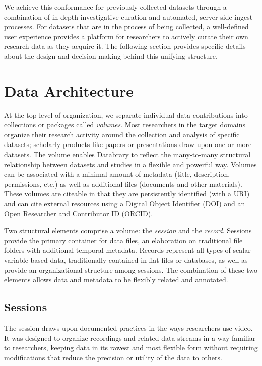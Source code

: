 \documentclass{sig-alternate}
\begin{document}
We achieve this conformance for previously collected datasets through a combination of in-depth investigative curation and automated, server-side ingest processes.
For datasets that are in the process of being collected, a well-defined user experience provides a platform for researchers to actively curate their own research data as they acquire it. 
The following section provides specific details about the design and decision-making behind this unifying structure.

\section{Data Architecture}

At the top level of organization, we separate individual data contributions into collections or packages called \emph{volumes}.
Most researchers in the target domains organize their research activity around the collection and analysis of specific datasets; scholarly products like papers or presentations draw upon one or more datasets.
The volume enables Databrary to reflect the many-to-many structural relationship between datasets and studies in a flexible and powerful way.
Volumes can be associated with a minimal amount of metadata (title, description, permissions, etc.) as well as additional files (documents and other materials).
These volumes are citeable in that they are persistently identified (with a URI) and can cite external resources using a Digital Object Identifier (DOI) and an Open Researcher and Contributor ID (ORCID).

Two structural elements comprise a volume: the \emph{session} and the \emph{record}.
Sessions provide the primary container for data files, an elaboration on traditional file folders with additional temporal metadata.
Records represent all types of scalar variable-based data, traditionally contained in flat files or databases, as well as provide an organizational structure among sessions.
The combination of these two elements allows data and metadata to be flexibly related and annotated.

\subsection{Sessions}

The session draws upon documented practices in the ways researchers use video.
It was designed to organize recordings and related data streams in a way familiar to researchers, keeping data in its rawest and most flexible form without requiring  modifications that reduce the precision or utility of the data to others.
\end{document}
